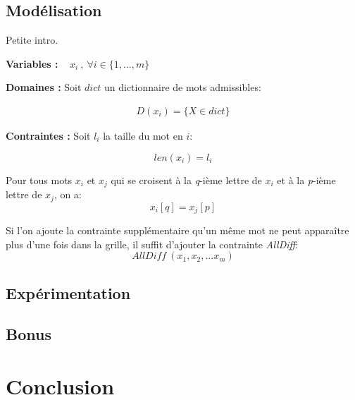 \documentclass[11pt, letterpaper]{article}
\begin{document}
\subsection{Mod\'{e}lisation}

Petite intro. \bigskip

\textbf{Variables :} ~ $x_{i}~,~\forall i \in \{1,...,m\}$

\bigskip

\textbf{Domaines :} Soit $dict$ un dictionnaire de mots admissibles:

\begin{align*}
D(x_{i}) = \{ X \in dict \}
\end{align*}

\bigskip

\textbf{Contraintes :} Soit $l_{i}$ la taille du mot en $i$:

\begin{equation} 
len(x_{i}) = l_{i}
\end{equation}
\par
Pour tous mots $x_{i}$ et $x_{j}$ qui se croisent \`{a} la \textit{q}-i\`{e}me lettre de $x_{i}$ et \`{a} la \textit{p}-i\`{e}me lettre de $x_{j}$, on a:
\begin{equation} 
x_{i}[q] = x_{j}[p]
\end{equation}
\par
Si l'on ajoute la contrainte suppl\'{e}mentaire qu'un m\^{e}me mot ne peut appara\^{i}tre plus d'une fois dans la grille, il suffit d'ajouter la contrainte \textit{AllDiff}:
\begin{equation} 
\textit{AllDiff}~(x_{1},x_{2},...x_{m})
\end{equation}

\subsection{Exp\'{e}rimentation}

\subsection{Bonus}

\newpage

\section*{Conclusion}
\end{document}
